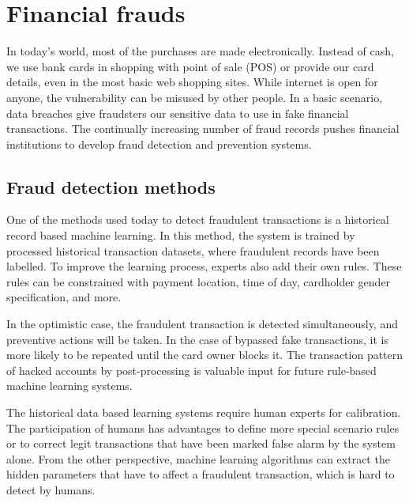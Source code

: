 \chapter{Financial frauds}

In today's world, most of the purchases are made electronically. 
Instead of cash, we use bank cards in shopping with point of sale (POS) or provide our card details, even in the most basic web shopping sites.
While internet is open for anyone, the vulnerability can be misused by other people.
In a basic scenario, data breaches give fraudsters our sensitive data to use in fake financial transactions.
The continually increasing number of fraud records pushes financial institutions to develop fraud detection and prevention systems.

\section{Fraud detection methods}

One of the methods used today to detect fraudulent transactions is a historical record based machine learning.
In this method, the system is trained by processed historical transaction datasets, where fraudulent records have been labelled.
To improve the learning process, experts also add their own rules.
These rules can be constrained with payment location, time of day, cardholder gender specification, and more.

In the optimistic case, the fraudulent transaction is detected simultaneously, and preventive actions will be taken.
In the case of bypassed fake transactions, it is more likely to be repeated until the card owner blocks it.
The transaction pattern of hacked accounts by post-processing is valuable input for future rule-based machine learning systems.

The historical data based learning systems require human experts for calibration.
The participation of humans has advantages to define more special scenario rules or to correct legit transactions that have been marked false alarm by the system alone.
From the other perspective, machine learning algorithms can extract the hidden parameters that have to affect a fraudulent transaction, which is hard to detect by humans.

